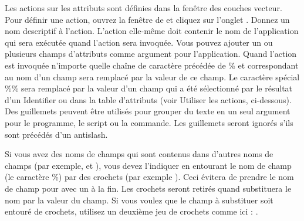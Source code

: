 Les actions sur les attributs sont définies dans la fenêtre  des couches vecteur. Pour définir une action, ouvrez la fenêtre de  et cliquez sur l'onglet . Donnez un nom descriptif à l'action. L'action elle-même doit contenir le nom de l'application qui sera exécutée quand l'action sera invoquée. Vous pouvez ajouter un ou plusieurs champs d'attributs comme argument pour l'application. Quand l'action est invoquée n'importe quelle chaîne de caractère précédée de \% et correspondant au nom d'un champ sera remplacé par la valeur de ce champ. Le caractère spécial \%\% \index{\%\%} sera remplacé par la valeur d'un champ qui a été sélectionné par le résultat d'un Identifier ou dans la table d'attributs (voir Utiliser les actions, ci-dessous). Des guillemets peuvent être utilisés pour grouper du texte en un seul argument pour le programme, le script ou la commande. Les guillemets seront ignorés s'ils sont précédés d'un antislash.

Si vous avez des noms de champs qui sont contenus dans d'autres noms de champs (par exemple,  et ), vous devez l'indiquer en entourant le nom de champ (le caractère \%) par des crochets (par exemple \usertext{[\%col10]}). Ceci évitera de prendre le nom de champ  pour  avec un  à la fin. Les crochets seront retirés quand \qg substituera le nom par la valeur du champ. Si vous voulez que le champ à substituer soit entouré de crochets, utilisez un deuxième jeu de crochets comme ici : \usertext{[[\%col10]]}.

